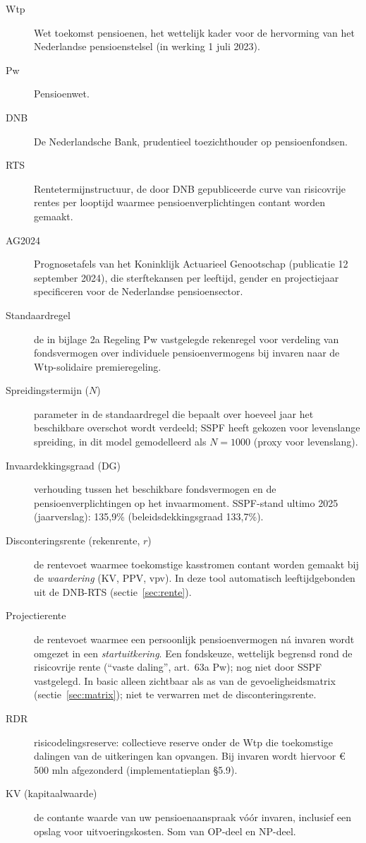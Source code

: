 \documentclass[11pt,a4paper]{article}
\newcommand{\dG}{\text{DG}}
\begin{document}
\begin{description}
\item[Wtp] Wet toekomst pensioenen, het wettelijk kader voor de hervorming van het Nederlandse pensioenstelsel (in werking 1 juli 2023).
\item[Pw] Pensioenwet.
\item[DNB] De Nederlandsche Bank, prudentieel toezichthouder op pensioenfondsen.
\item[RTS] Rentetermijnstructuur, de door DNB gepubliceerde curve van risicovrije rentes per looptijd waarmee pensioenverplichtingen contant worden gemaakt.
\item[AG2024] Prognosetafels van het Koninklijk Actuarieel Genootschap (publicatie 12 september 2024), die sterftekansen per leeftijd, gender en projectiejaar specificeren voor de Nederlandse pensioensector.
\item[Standaardregel] de in bijlage 2a Regeling Pw vastgelegde rekenregel voor verdeling van fondsvermogen over individuele pensioenvermogens bij invaren naar de Wtp-solidaire premieregeling.
\item[Spreidingstermijn ($N$)] parameter in de standaardregel die bepaalt over hoeveel jaar het beschikbare overschot wordt verdeeld; SSPF heeft gekozen voor levenslange spreiding, in dit model gemodelleerd als $N = 1000$ (proxy voor levenslang).
\item[Invaardekkingsgraad ($\dG$)] verhouding tussen het beschikbare fondsvermogen en de pensioenverplichtingen op het invaarmoment. SSPF-stand ultimo 2025 (jaarverslag): 135,9\% (beleidsdekkingsgraad 133,7\%).
\item[Disconteringsrente (rekenrente, $r$)] de rentevoet waarmee toekomstige kasstromen contant worden gemaakt bij de \emph{waardering} (KV, PPV, vpv). In deze tool automatisch leeftijdgebonden uit de DNB-RTS (sectie~\ref{sec:rente}).
\item[Projectierente] de rentevoet waarmee een persoonlijk pensioenvermogen ná invaren wordt omgezet in een \emph{startuitkering}. Een fondskeuze, wettelijk begrensd rond de risicovrije rente (``vaste daling'', art.\ 63a Pw); nog niet door SSPF vastgelegd. In basic alleen zichtbaar als as van de gevoeligheidsmatrix (sectie~\ref{sec:matrix}); niet te verwarren met de disconteringsrente.
\item[RDR] risicodelingsreserve: collectieve reserve onder de Wtp die toekomstige dalingen van de uitkeringen kan opvangen. Bij invaren wordt hiervoor €\,500 mln afgezonderd (implementatieplan \S5.9).
\item[KV (kapitaalwaarde)] de contante waarde van uw pensioenaanspraak vóór invaren, inclusief een opslag voor uitvoeringskosten. Som van OP-deel en NP-deel.

\end{description}
\end{document}
